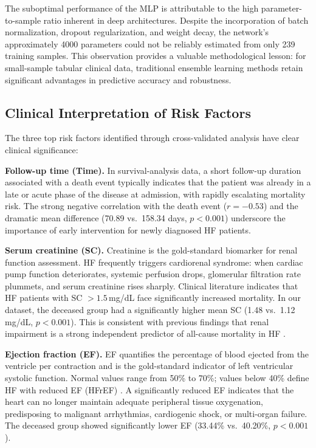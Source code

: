 \documentclass[12pt,a4paper]{article}
\begin{document}
The suboptimal performance of the MLP is attributable to the high parameter-to-sample ratio inherent in deep architectures. Despite the incorporation of batch normalization, dropout regularization, and weight decay, the network's approximately 4000 parameters could not be reliably estimated from only 239 training samples. This observation provides a valuable methodological lesson: for small-sample tabular clinical data, traditional ensemble learning methods retain significant advantages in predictive accuracy and robustness.

\subsection{Clinical Interpretation of Risk Factors}

The three top risk factors identified through cross-validated analysis have clear clinical significance:

\textbf{Follow-up time (Time).} In survival-analysis data, a short follow-up duration associated with a death event typically indicates that the patient was already in a late or acute phase of the disease at admission, with rapidly escalating mortality risk. The strong negative correlation with the death event ($r = -0.53$) and the dramatic mean difference (70.89 vs.\ 158.34 days, $p < 0.001$) underscore the importance of early intervention for newly diagnosed HF patients.

\textbf{Serum creatinine (SC).} Creatinine is the gold-standard biomarker for renal function assessment. HF frequently triggers cardiorenal syndrome: when cardiac pump function deteriorates, systemic perfusion drops, glomerular filtration rate plummets, and serum creatinine rises sharply. Clinical literature indicates that HF patients with SC $> 1.5$\,mg/dL face significantly increased mortality. In our dataset, the deceased group had a significantly higher mean SC (1.48 vs.\ 1.12\,mg/dL, $p < 0.001$). This is consistent with previous findings that renal impairment is a strong independent predictor of all-cause mortality in HF \citep{chicco2020ml, ali2023ml}.

\textbf{Ejection fraction (EF).} EF quantifies the percentage of blood ejected from the ventricle per contraction and is the gold-standard indicator of left ventricular systolic function. Normal values range from 50\% to 70\%; values below 40\% define HF with reduced EF (HFrEF) \citep{austin2013}. A significantly reduced EF indicates that the heart can no longer maintain adequate peripheral tissue oxygenation, predisposing to malignant arrhythmias, cardiogenic shock, or multi-organ failure. The deceased group showed significantly lower EF (33.44\% vs.\ 40.20\%, $p < 0.001$).
\end{document}
